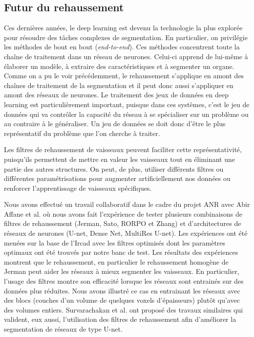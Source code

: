 \subsection{Futur du rehaussement}
Ces dernières années, le deep learning est devenu la technologie la plus explorée pour résoudre des tâches complexes de segmentation. En particulier,  on privilégie les méthodes de bout en bout (\textit{end-to-end}). Ces méthodes concentrent toute la chaîne de traitement dans un réseau de neurones. Celui-ci apprend de lui-même à élaborer un modèle, à extraire des caractéristiques et à segmenter un organe. Comme on a pu le voir précédemment, le rehaussement s'applique en amont des chaînes de traitement de la segmentation et il peut donc aussi s'appliquer en amont des réseaux de neurones. Le traitement des jeux de données en deep learning est particulièrement important, puisque dans ces systèmes, c'est le jeu de données qui va contrôler la capacité du réseau à se spécialiser sur un problème ou au contraire à le généraliser. Un jeu de données se doit donc d'être le plus représentatif du problème que l'on cherche à traiter.

Les filtres de rehaussement de vaisseaux peuvent faciliter cette représentativité, puisqu'ils permettent de mettre en valeur les vaisseaux tout en éliminant une partie des autres structures. On peut, de plus, utiliser différents filtres ou différentes paramétrisations pour augmenter artificiellement nos données ou renforcer l'apprentissage de vaisseaux spécifiques.

Nous avons effectué un travail collaboratif \cite{Affane_2022_article_commun} dans le cadre du projet ANR avec Abir Affane et al. où nous avons fait l'expérience de tester plusieurs combinaisons de filtres de rehaussement (Jerman, Sato, RORPO et Zhang) et d'architectures de réseaux de neurones (U-net, Dense Net, MultiRes U-net). Les expériences ont été menées sur la base de l'Ircad avec les filtres optimisés dont les paramètres optimaux ont été trouvés par notre banc de test. Les résultats des expériences montrent que le rehaussement, en particulier le rehaussement homogène de Jerman peut aider les réseaux à mieux segmenter les vaisseaux. En particulier, l'usage des filtres montre son efficacité lorsque les réseaux sont entrainés sur des données plus réduites. Nous avons illustré ce cas en entrainant les réseaux avec des blocs (couches d'un volume de quelques voxels d'épaisseurs) plutôt qu'avec des volumes entiers. Survarachakan et al. \cite{Survarachakan2021_deep_vesselness} ont proposé des travaux similaires qui valident, eux aussi, l'utilisation des filtres de rehaussement afin d'améliorer la segmentation de réseaux de type U-net.


